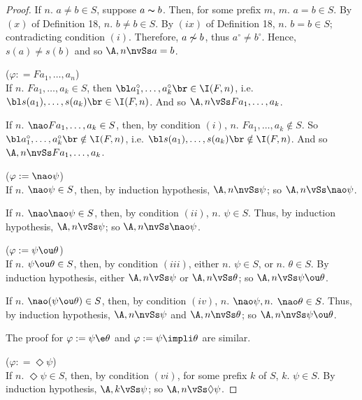 \begin{proof}
\qquad If $n.$ $a\neq b \in S$, suppose $a\thicksim b$. Then, for some prefix $m$, $m.$ $a = b \in S$. By $(x)$ of Definition 18, $n.$ $b\neq b \in S$. By $(ix)$ of Definition 18, $n.$ $b= b \in S$; contradicting condition $(i)$. Therefore, $a \not \thicksim b$, thus $a^{\circ} \neq b^{\circ}$. Hence, $s(a)\neq s(b)$ and so $\A,n \nvSs a=b$. 



\vspace{10mm}

($\varphi: = Fa_{1},\dots,a_{n}$)\\
\qquad If $n.$ $Fa_1, \dots ,a_k \in S$, then $\bl a_1^{\circ}, \dots, a_k^{\circ} \br \in \I(F,n)$, i.e. $\bl s(a_1), \dots, s(a_k) \br \in \I(F,n)$. And so  $\A,n \vSs Fa_1, \dots ,a_k$.   

\qquad If $n.$ $\nao Fa_1, \dots ,a_k \in S$, then, by condition $(i)$, $n.$ $Fa_1, \dots ,a_k \notin S$. So $\bl a_1^{\circ}, \dots, a_k^{\circ} \br \notin \I(F,n)$, i.e. $\bl s(a_1), \dots, s(a_k) \br \notin \I(F,n)$. And so  $\A,n \nvSs Fa_1, \dots ,a_k$.     
\vspace{10mm}


($\varphi := \nao \psi$)\\
\qquad If $n.$ $\nao \psi \in S$, then, by induction hypothesis, $\A,n \nvSs \psi$; so $\A,n \vSs \nao \psi$. 

\qquad If $n.$ $\nao\nao \psi \in S$, then, by condition $(ii)$, $n.$ $\psi \in S$. Thus, by induction hypothesis, $\A,n \vSs \psi$; so $\A,n \nvSs \nao\psi$.  

\vspace{10mm}

($\varphi: = \psi \ou \theta$)\\
\qquad If $n.$ $\psi \ou \theta \in S$, then, by condition $(iii)$, either $n.$ $\psi \in S$, or $n.$ $\theta \in S$.  By induction hypothesis, either $\A,n \vSs \psi$ or $\A,n \vSs \theta$; so $\A,n \vSs \psi \ou \theta$. 

\qquad If $n.$ $\nao(\psi \ou \theta) \in S$, then, by condition $(iv)$, $n.$ $\nao \psi, n.$ $\nao \theta \in S$. Thus, by induction hypothesis, $\A,n \nvSs \psi$ and $\A,n \nvSs \theta$; so $\A,n \nvSs \psi\ou\theta$.  
\vspace{10mm}


\qquad The proof for $\varphi := \psi \e \theta$ and $\varphi := \psi \impli \theta$ are similar.
\vspace{10mm}



($\varphi: = \Diamond \psi$)\\
\qquad If $n.$ $\Diamond \psi \in S$, then, by condition $(vi)$, for some prefix $k$ of $S$, $k.$ $\psi \in S$. By induction hypothesis, $\A,k \vSs \psi$; so  $\A,n \vSs \Diamond\psi$.  


\end{proof}
